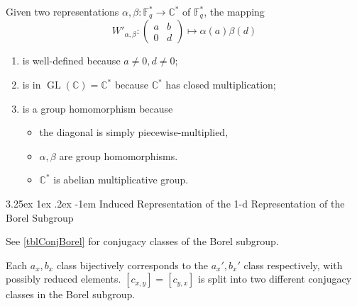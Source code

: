 \documentclass[12pt, letterpaper]{article}
\makeatletter
\newcommand{\co}{\mathbb{C}}
\newcommand{\field}{\mathbb{F}}
\newcommand{\GL}{\operatorname{GL}}
\newcommand{\ec}[1]{\left[{#1}\right]}
\renewcommand\paragraph{\@startsection{paragraph}{4}{\z@}%
	{3.25ex \@plus1ex \@minus.2ex}%
	{-1em}%
	{\normalfont\normalsize\bfseries}}
\theoremstyle{definition}
\theoremstyle{remark}
\theoremstyle{definition}
\theoremstyle{plain}
\numberwithin{equation}{section}
\makeatother
\begin{document}
	Given two representations $\alpha,\beta\colon\field_q^*\to\co^*$ of $\field_q^*$, the mapping
	\[
	W'_{\alpha,\beta}\colon\begin{pmatrix}
		a&b\\0&d
	\end{pmatrix}
	\mapsto
	\alpha(a)\beta(d)
	\]
	\begin{enumerate}
		\item is well-defined because $a\ne0,d\ne0$;
		\item is in $\GL(\co)=\co^*$ because $\co^*$ has closed multiplication;
		\item is a group homomorphism because 
		\begin{itemize}
			\item the diagonal is simply piecewise-multiplied,
			\item $\alpha,\beta$ are group homomorphisms.
			\item $\co^*$ is abelian multiplicative group.
		\end{itemize}
	\end{enumerate}

	\paragraph{Induced Representation of the 1-d Representation of the Borel Subgroup}
	
	See \autoref{tblConjBorel} for conjugacy classes of the Borel subgroup.
	
	Each $a_x,b_x$ class bijectively corresponds to the $a_x',b_x'$ class respectively, with possibly reduced elements.
	$\ec{c_{x,y}}=\ec{c_{y,x}}$ is split into two different conjugacy classes in the Borel subgroup.
	
\end{document}
